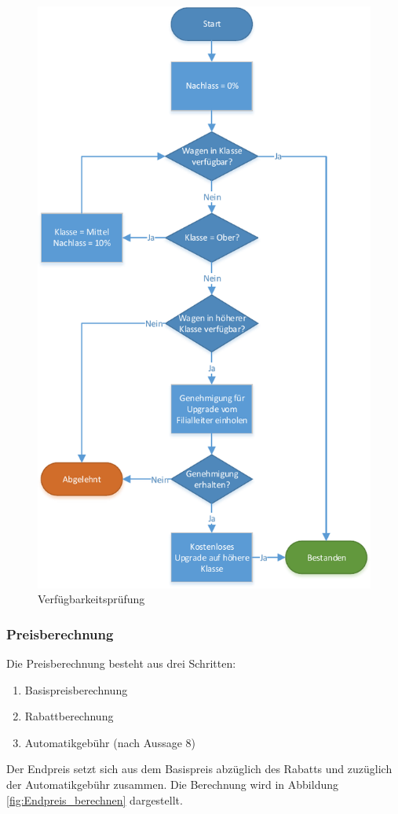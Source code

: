 \begin{figure}[p]
\centering
\includegraphics[width=0.75\linewidth]{Bilder/Verfuegbarkeit_pruefen}
\caption{Verfügbarkeitsprüfung}
\label{fig:Verfuegbarkeit_pruefen}
\end{figure}

\subsubsection{Preisberechnung}

Die Preisberechnung besteht aus drei Schritten:
\begin{enumerate}
	\item Basispreisberechnung
	\item Rabattberechnung
	\item Automatikgebühr (nach Aussage 8)
\end{enumerate}

Der Endpreis setzt sich aus dem Basispreis abzüglich des Rabatts und zuzüglich 
der Automatikgebühr zusammen. Die Berechnung wird in Abbildung \ref{fig:Endpreis_berechnen}
dargestellt.

